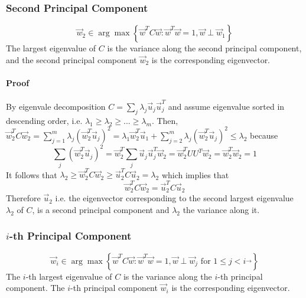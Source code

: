 \subsubsection{Second Principal Component}
\begin{equation}
    \vec{w}_2 \in \arg \max \left\{ \vec{w}^T C \vec{w} : \vec{w}^T \vec{w} = 1, \vec{w} \perp \vec{w}_1 \right\}
\end{equation}
The largest eigenvalue of \(C\) is the variance along the second principal component, and the second principal component \(\vec{w}_2\) is the corresponding eigenvector.

\paragraph{Proof}
By eigenvale decomposition \(C = \sum_j \lambda_j \vec{u}_j \vec{u}_j^T\) and assume eigenvalue sorted in descending order, i.e. \(\lambda_1 \geq \lambda_2 \geq ... \geq \lambda_m\). Then, \(\vec{w}_2^T C \vec{w}_2 = \sum_{j=1}^m \lambda_j (\vec{w}_2^T \vec{u}_j)^2 = \lambda_1 \vec{w}_2^T \vec{u}_1 + \sum_{j=2}^m \lambda_j (\vec{w}_2^T \vec{u}_j)^2 \leq \lambda_2\) because
\begin{equation*}
    \sum_j (\vec{w}_2^T \vec{u}_j)^2 = \vec{w}_2^T \sum_j \vec{u}_j \vec{u}_j^T \vec{w}_2 = \vec{w}_2^T UU^T \vec{w}_2 = \vec{w}_2^T \vec{w}_2 = 1
\end{equation*}
It follows that \(\lambda_2 \geq \vec{w}_2^T C \vec{w}_2 \geq \vec{u}_2^T C \vec{u}_2 = \lambda_2\) which implies that 
\begin{equation*}
    \vec{w}_2^T C \vec{w}_2 = \vec{u}_2^T C \vec{u}_2
\end{equation*}
Therefore \(\vec{u}_2\) i.e. the eigenvector corresponding to the second largest eigenvalue \(\lambda_2\) of \(C\), is a second principal component and \(\lambda_2\) the variance along it.

\subsubsection{\(i\)-th Principal Component}
\begin{equation}
    \vec{w}_i \in \arg \max \left\{ \vec{w}^T C \vec{w} : \vec{w}^T \vec{w} = 1, \vec{w} \perp \vec{w}_j \text{ for } 1 \leq j < i\vec{} \right\}
\end{equation}
The \(i\)-th largest eigenvalue of \(C\) is the variance along the \(i\)-th principal component. The \(i\)-th principal component \(\vec{w}_i\) is the corresponding eigenvector.

